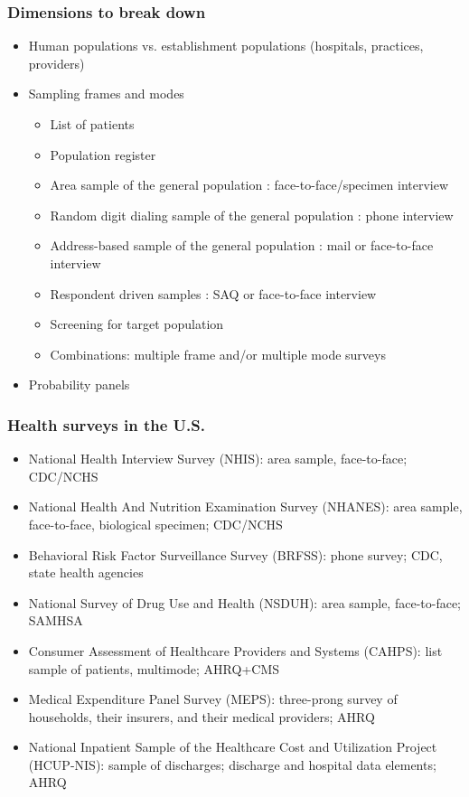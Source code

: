 \documentclass[aspectratio=43]{beamer}
\begin{document}
\begin{frame}\frametitle{Dimensions to break down}

\begin{itemize}
    \item Human populations vs. establishment populations (hospitals, practices, providers)
    \item Sampling frames and modes
    \begin{itemize}
        \item List of patients
        \item Population register
        \item Area sample of the general population : face-to-face/specimen interview
        \item Random digit dialing sample of the general population : phone interview
        \item Address-based sample of the general population : mail or face-to-face interview
        \item Respondent driven samples : SAQ or face-to-face interview
        \item Screening for target population
        \item Combinations: multiple frame and/or multiple mode surveys
    \end{itemize}
    \item Probability panels
\end{itemize}

\end{frame}

\begin{frame}\frametitle{Health surveys in the U.S.}

\begin{itemize}
    \item National Health Interview Survey (NHIS): area sample, face-to-face; CDC/NCHS
    \item National Health And Nutrition Examination Survey (NHANES): area sample, face-to-face, biological specimen; CDC/NCHS
    \item Behavioral Risk Factor Surveillance Survey (BRFSS): phone survey; CDC, state health agencies
    \item National Survey of Drug Use and Health (NSDUH): area sample, face-to-face; SAMHSA
    \item Consumer Assessment of Healthcare Providers and Systems (CAHPS): list sample of patients, multimode; AHRQ+CMS
    \item Medical Expenditure Panel Survey (MEPS): three-prong survey of households, their insurers, and their medical providers; AHRQ
    \item National Inpatient Sample of the Healthcare Cost and Utilization Project (HCUP-NIS): 
    	sample of discharges; discharge and hospital data elements; AHRQ
\end{itemize}

\end{frame}
\end{document}
